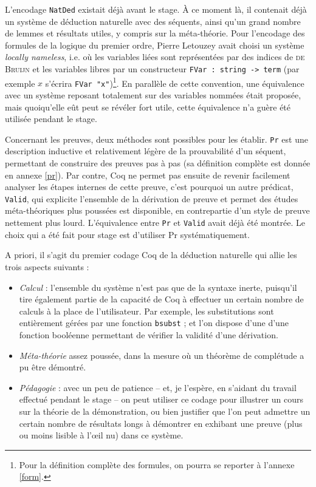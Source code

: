 \documentclass[a4paper]{article}
\begin{document}
L'encodage \verb+NatDed+ existait déjà avant le stage. \`A ce moment là, il contenait déjà un système de déduction naturelle avec des séquents, ainsi qu'un grand nombre de lemmes et résultats utiles, y compris sur la méta-théorie. Pour l'encodage des formules de la logique du premier ordre, Pierre Letouzey avait choisi un système \emph{locally nameless}, i.e. où les variables liées sont représentées par des indices de \textsc{de Bruijn} et les variables libres par un constructeur \verb+FVar : string -> term+ (par exemple $x$ s'écrira \verb+FVar "x"+)\footnote{Pour la définition complète des formules, on pourra se reporter à l'annexe \ref{form}.}. En parallèle de cette convention, une équivalence avec un système reposant totalement sur des variables nommées était proposée, mais quoiqu'elle eût peut se révéler fort utile, cette équivalence n'a guère été utilisée pendant le stage.

Concernant les preuves, deux méthodes sont possibles pour les établir. \verb+Pr+ est une description inductive et relativement légère de la prouvabilité d'un séquent, permettant de construire des preuves pas à pas (sa définition complète est donnée en annexe \ref{pr}). Par contre, Coq ne permet pas ensuite de revenir facilement analyser les étapes internes de cette preuve, c'est pourquoi un autre prédicat, \verb+Valid+, qui explicite l'ensemble de la dérivation de preuve et permet des études méta-théoriques plus poussées est disponible, en contrepartie d'un style de preuve nettement plus lourd. L'équivalence entre \verb+Pr+ et \verb+Valid+ avait déjà été montrée. Le choix qui a été fait pour stage est d’utiliser Pr systématiquement.
\medskip

A priori, il s'agit du premier codage Coq de la déduction naturelle qui allie les trois aspects suivants :
\begin{itemize}
\item \emph{Calcul} : l'ensemble du système n'est pas que de la syntaxe inerte, puisqu'il tire également partie de la capacité de Coq à effectuer un certain nombre de calculs à la place de l'utilisateur. Par exemple, les substitutions sont entièrement gérées par une fonction \verb+bsubst+ ; et l'on dispose d'une d'une fonction booléenne permettant de vérifier la validité d'une dérivation.
\item \emph{Méta-théorie} assez poussée, dans la mesure où un théorème de complétude a pu être démontré.
\item \emph{Pédagogie} : avec un peu de patience -- et, je l'espère, en s'aidant du travail effectué pendant le stage -- on peut utiliser ce codage pour illustrer un cours sur la théorie de la démonstration, ou bien justifier que l'on peut admettre un certain nombre de résultats longs à démontrer en exhibant une preuve (plus ou moins lisible à l'\oe il nu) dans ce système.
\end{itemize}
\end{document}
